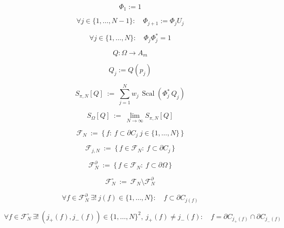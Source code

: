 \documentclass[12pt]{article}
\begin{document}
\begin{equation}
\Phi_1:=1
\end{equation}

\begin{equation}
\forall j\in\{1,\dots,N-1\}:\quad \Phi_{j+1}:=\Phi_jU_j
\end{equation}

\begin{equation}
\forall j\in\{1,\dots,N\}:\quad \Phi_j\Phi_j^*=1
\end{equation}

\begin{equation}
Q:\Omega\to A_m
\end{equation}

\begin{equation}
Q_j:=Q(p_j)
\end{equation}

\begin{equation}
S_{\pi,N}[Q]\ :=\ \sum_{j=1}^N w_j\,\operatorname{Scal}\!\left(\Phi_j^*\,Q_j\right)
\end{equation}

\begin{equation}
S_\Omega[Q]\ :=\ \lim_{N\to\infty}S_{\pi,N}[Q]
\end{equation}

\begin{equation}
\mathcal{F}_N\ :=\ \bigl\{\,f:\ f\subset\partial C_j\ j\in\{1,\dots,N\}\,\bigr\}
\end{equation}

\begin{equation}
\mathcal{F}_{j,N}\ :=\ \bigl\{\,f\in\mathcal{F}_N:\ f\subset\partial C_j\,\bigr\}
\end{equation}

\begin{equation}
\mathcal{F}_N^\partial\ :=\ \bigl\{\,f\in\mathcal{F}_N:\ f\subset\partial\Omega\,\bigr\}
\end{equation}

\begin{equation}
\mathcal{F}_N^\circ\ :=\ \mathcal{F}_N\setminus\mathcal{F}_N^\partial
\end{equation}

\begin{equation}
\forall f\in\mathcal{F}_N^\partial\ \exists!\ j(f)\in\{1,\dots,N\}:\quad f\subset\partial C_{j(f)}
\end{equation}

\begin{equation}
\forall f\in\mathcal{F}_N^\circ\ \exists!\ (j_+(f),j_-(f))\in\{1,\dots,N\}^2,\ j_+(f)\neq j_-(f):\quad f=\partial C_{j_+(f)}\cap\partial C_{j_-(f)}
\end{equation}
\end{document}
